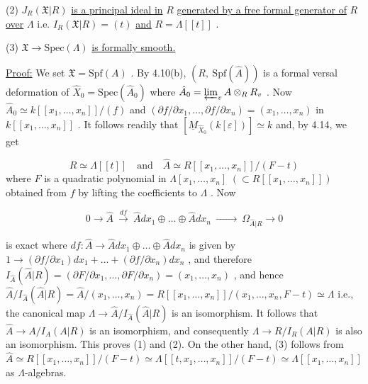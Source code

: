 (2)  $J_R(\mathfrak{X}|R)$  \underline{is a principal ideal in}  $R$  \underline{generated by a free formal generator of}  $R$  \underline{over}  $\Lambda$  i.e.  $I_R(\mathfrak{X}|R) = (t)$  \underline{and}  $R = \Lambda[[t]]$  .

(3)  $\mathfrak{X} \rightarrow \mathrm{Spec}(\Lambda)$  \underline{is formally smooth.}

\underline{Proof:}  We set  $\mathfrak{X} = \mathrm{Spf}(A)$  . By 4.10(b),  $(R,\ \mathrm{Spf}(\hat{A}))$  is a formal versal deformation of  $\hat{X}_0 = \mathrm{Spec}(\hat{A}_0)$  where  $\hat{A}_0 = \varprojlim_{v} A \otimes_R R_v$  . Now  $\hat{A}_0 \simeq k[[x_1,\dots,x_n]]/(f)$  and  $(\partial f/\partial x_1,\dots,\partial f/\partial x_n) = (x_1,\dots,x_n)$  in $k[[x_1,\dots,x_n]]$  . It follows readily that  $[\underline{M}_{\hat{X}_0}(k[\varepsilon])] \simeq k$  and, by 4.14, we get

\begin{equation*}
R \simeq \Lambda[[t]] \quad\text{and}\quad \hat{A} \simeq R[[x_1,\dots,x_n]]/(F - t)
\end{equation*}
where  $F$  is a quadratic polynomial in  $\Lambda[x_1,\dots,x_n]$  $(\subset R[[x_1,\dots,x_n]])$ obtained from  $f$  by lifting the coefficients to  $\Lambda$  . Now

\begin{equation*}
0 \rightarrow \hat{A} \ \overset{df}{\longrightarrow}\ \hat{A}dx_1 \oplus \dots \oplus \hat{A}dx_n \ \xrightarrow{\hspace{3em}}\ \Omega_{\hat{A}|R} \rightarrow 0 
\end{equation*}


 is exact where  $df : \hat{A} \rightarrow \hat{A}dx_1 \oplus \dots \oplus \hat{A}dx_n$  is given by $1 \rightarrow (\partial f/\partial x_1)dx_1 + \dots + (\partial f/\partial x_n)dx_n$  , and therefore $I_{\hat{A}}(\hat{A}|R) = (\partial F/\partial x_1,\dots,\partial F/\partial x_n) = (x_1,\dots,x_n)$  , and hence $\hat{A}/I_{\hat{A}}(\hat{A}|R) = \hat{A}/(x_1,\dots,x_n) = R[[x_1,\dots,x_n]]/(x_1,\dots,x_n,F - t) \simeq \Lambda$ i.e., the canonical map  $\Lambda \rightarrow \hat{A}/I_{\hat{A}}(\hat{A}|R)$  is an isomorphism. It follows that $\hat{A} \rightarrow A/I_A(A|R)$  is an isomorphism, and consequently  $\Lambda \rightarrow R/I_R(A|R)$  is also an isomorphism. This proves (1) and (2). On the other hand, (3) follows from $\hat{A} \simeq R[[x_1,\dots,x_n]]/(F - t) \simeq \Lambda[[t,x_1,\dots,x_n]]/(F - t) \simeq \Lambda[[x_1,\dots,x_n]]$   as $\Lambda$-algebras.

